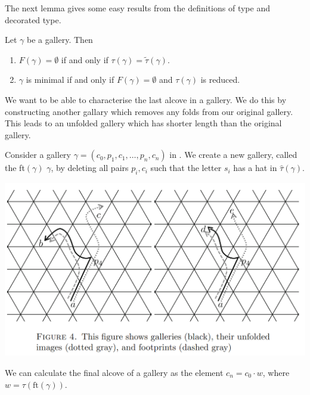 \documentclass[11pt]{article}
\begin{document}
The next lemma gives some easy results from the definitions of type and decorated type. 

\begin{lemma}\cite[p.128]{SHA}
    Let $\gamma$ be a gallery. Then
    \begin{enumerate}
        \item $F(\gamma)=\emptyset$ if and only if $\tau(\gamma)=\tilde{\tau}(\gamma).$
        \item $\gamma$ is minimal if and only if $F(\gamma)=\emptyset$ and $\tau(\gamma)$ is reduced.
    \end{enumerate}
\end{lemma}

We want to be able to characterise the last alcove in a gallery. We do this by constructing another gallary which removes any folds from our original gallery. This leads to an unfolded gallery which has shorter length than the original gallery.

\begin{definition}
    Consider a gallery $\gamma = (c_0,p_1,c_1,\hdots ,p_n,c_n)$ in \sg. We create a new gallery, called the  ft$(\gamma)$  $\gamma$, by deleting all pairs $p_i,c_i$ such that the letter $s_i$ has a hat in $\hat{\tau}(\gamma)$. 

\end{definition}

\begin{center}
\includegraphics[scale=0.4]{Screenshot 2023-02-03 133522.png}\\
\end{center}

\begin{lemma}
    We can calculate the final alcove of a gallery as the element $c_n=c_0\cdot w$, where $w=\tau(\text{ft}(\gamma))$.
\end{lemma}
\end{document}
